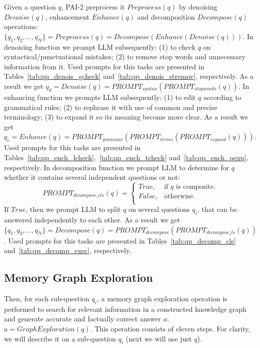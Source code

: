 Given a question $q$, PAI-2 preprocess it $Preprocess(q)$ by denoising $Denoise(q)$, enhancement $Enhance(q)$ and decomposition $Decompose(q)$ operations: $\{q_1, q_2, ..., q_N\} = Preprocess(q) = Decompose(Enhance(Denoise(q)))$. In denoising function we prompt LLM subsequently: (1) to check $q$ on syntactical/punctuational mistakes; (2) to remove stop words and unnecessary information from it. Used prompts for this tasks are presented in Tables~\ref{tab:qp_denois_gcheck} and~\ref{tab:qp_denois_stremov}, respectively. As a result we get $q_{d} = Denoise(q) = PROMPT_{syntax}(PROMPT_{stopwords}(q))$. In enhancing function we prompts LLM subsequently: (1) to edit $q$ according to grammatical rules; (2) to rephrase it with use of common and precise terminology; (3) to expand it so its meaning become more clear. As a result we get $q_{e} = Enhance(q) = PROMPT_{grammar}(PROMPT_{terms}(PROMPT_{expand}(q)))$. Used prompts for this tasks are presented in Tables~\ref{tab:qp_ench_lcheck},~\ref{tab:qp_ench_tcheck} and~\ref{tab:qp_ench_qexp}, respectively. In decomposition function we prompt LLM to determine for $q$ whether it contains several independent questions or not:
\[
PROMPT_{decompose\_cls}(q) = \left\{ \begin{array}{rcl}
True, & \text{if $q$ is composite}. \\ 
False, & \text{otherwise}. \\ 
\end{array}\right.
\]
If $True$, then we prompt LLM to split $q$ on several questions $q_i$, that can be answered independently to each other. As a result we get $\{q_1, q_2, ..., q_N\} = Decompose(q) = PROMPT_{decompose}(PROMPT_{decompose_cls}(q))$. Used prompts for this tasks are presented in Tables~\ref{tab:qp_decomp_cls} and~\ref{tab:qp_decomp_exec}, respectively.

\subsection{Memory Graph Exploration}

Then, for each sub-question $q_i$, a memory graph exploration operation is performed to search for relevant information in a constructed knowledge graph and generate accurate and factually correct answer $a$: $a = GraphExploration(q)$. This operation consists of eleven steps. For clarity, we will describe it on a sub-question $q_i$ (next we will use just $q$).


